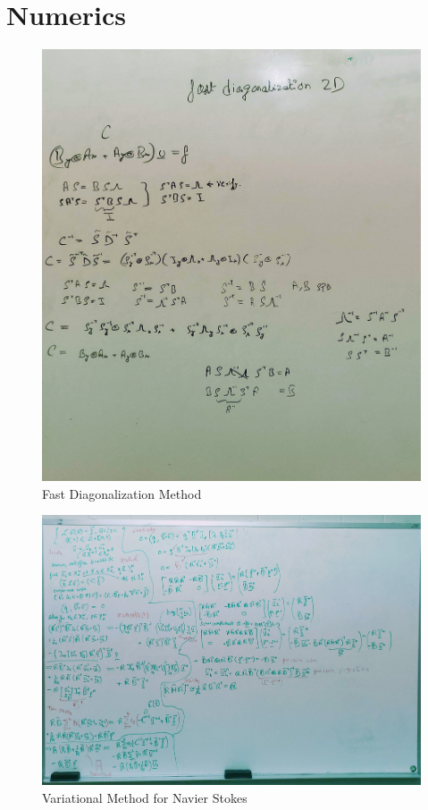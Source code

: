 \chapter{Numerics}

\begin{figure}[h!]
    \centering
    \includegraphics[width=1.0\textwidth]{fig/FDM.jpg}
    \caption{Fast Diagonalization Method}
    \label{fig:rtt}
\end{figure}

\begin{figure}[h!]
    \centering
    \includegraphics[width=1.0\textwidth]{fig/varNS.jpg}
    \caption{Variational Method for Navier Stokes}
    \label{fig:rtt}
\end{figure}


